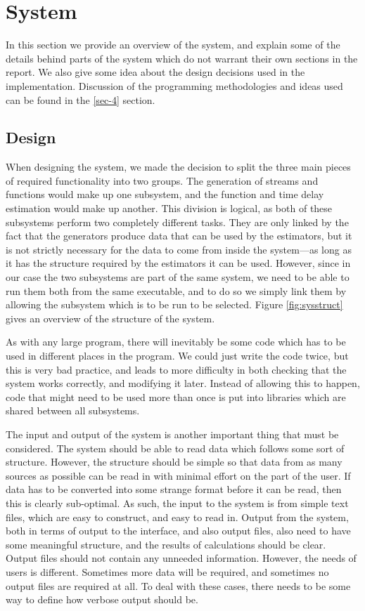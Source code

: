 \documentclass[a4paper,11pt]{article}
\begin{document}
\section{System}
\label{sec-3}

In this section we provide an overview of the system, and explain some of the
details behind parts of the system which do not warrant their own sections in
the report. We also give some idea about the design decisions used in the
implementation. Discussion of the programming methodologies and ideas used can
be found in the \ref{sec-4} section.
\subsection{Design}
\label{sec-3-1}

   When designing the system, we made the decision to split the three main
   pieces of required functionality into two groups. The generation of streams
   and functions would make up one subsystem, and the function and time delay
   estimation would make up another. This division is logical, as both of these
   subsystems perform two completely different tasks. They are only linked by
   the fact that the generators produce data that can be used by the estimators,
   but it is not strictly necessary for the data to come from inside the
   system---as long as it has the structure required by the estimators it can be
   used. However, since in our case the two subsystems are part of the same
   system, we need to be able to run them both from the same executable, and to
   do so we simply link them by allowing the subsystem which is to be run to be
   selected. Figure \ref{fig:sysstruct} gives an overview of the structure of
   the system.

   As with any large program, there will inevitably be some code which has to be
   used in different places in the program. We could just write the code twice,
   but this is very bad practice, and leads to more difficulty in both checking
   that the system works correctly, and modifying it later. Instead of allowing
   this to happen, code that might need to be used more than once is put into
   libraries which are shared between all subsystems.

   The input and output of the system is another important thing that must be
   considered. The system should be able to read data which follows some sort of
   structure. However, the structure should be simple so that data from as many
   sources as possible can be read in with minimal effort on the part of the
   user. If data has to be converted into some strange format before it can be
   read, then this is clearly sub-optimal. As such, the input to the system is
   from simple text files, which are easy to construct, and easy to read
   in. Output from the system, both in terms of output to the interface, and
   also output files, also need to have some meaningful structure, and the
   results of calculations should be clear. Output files should not contain any
   unneeded information. However, the needs of users is different. Sometimes
   more data will be required, and sometimes no output files are required at
   all. To deal with these cases, there needs to be some way to define how
   verbose output should be.
\end{document}
